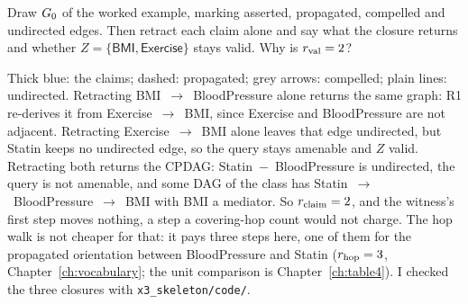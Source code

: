 \begin{exercicio}[metodo=drawing,conceito=testemunha]
Draw $G_0$ of the worked example, marking asserted, propagated, compelled and undirected edges. Then
retract each claim alone and say what the closure returns and whether $Z = \{\textsf{BMI},
\textsf{Exercise}\}$ stays valid. Why is $r_{\mathrm{val}} = 2$?
\end{exercicio}
\begin{solucao}
\begin{center}
\end{center}
Thick blue: the claims; dashed: propagated; grey arrows: compelled; plain lines: undirected.
Retracting \textsf{BMI}~$\to$~\textsf{BloodPressure} alone returns the same graph: R1 re-derives it
from \textsf{Exercise}~$\to$~\textsf{BMI}, since \textsf{Exercise} and \textsf{BloodPressure} are
not adjacent. Retracting \textsf{Exercise}~$\to$~\textsf{BMI} alone leaves that edge undirected, but
\textsf{Statin} keeps no undirected edge, so the query stays amenable and $Z$ valid. Retracting both
returns the CPDAG: \textsf{Statin}~$-$~\textsf{BloodPressure} is undirected, the query is not
amenable, and some DAG of the class has \textsf{Statin}~$\to$~\textsf{BloodPressure}~$\to$~\textsf{BMI}
with \textsf{BMI} a mediator. So $r_{\mathrm{claim}} = 2$, and the witness's first step moves nothing, a step a covering-hop count would not
charge. The hop walk is not cheaper for that: it pays three steps here, one of them for the propagated
orientation between \textsf{BloodPressure} and \textsf{Statin} ($r_{\mathrm{hop}} = 3$, Chapter~\ref{ch:vocabulary};
the unit comparison is Chapter~\ref{ch:table4}). I checked the three closures
with \texttt{x3\_skeleton/code/}.
\end{solucao}


